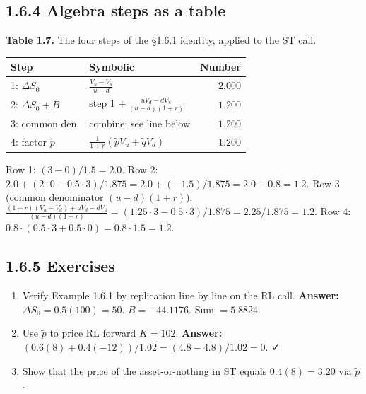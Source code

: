 \documentclass[
  10pt,
  twoside]{book}
\newcounter{none} %
\providecommand{\tightlist}{%
  \setlength{\itemsep}{0pt}\setlength{\parskip}{0pt}}
\begin{document}
\subsection{1.6.4 Algebra steps as a
table}\label{algebra-steps-as-a-table}

\textbf{Table 1.7.} The four steps of the §1.6.1 identity, applied to
the ST call.

{\def\LTcaptype{none} %
\begin{table}[H]
\centering
\begin{tabular}{|l|l|r|}
\toprule
Step & Symbolic & Number \\
\midrule



1: \(\Delta S_0\) & \(\tfrac{V_u-V_d}{u-d}\) & \(2.000\) \\
2: \(\Delta S_0+B\) & step 1 \(+\,\tfrac{uV_d-dV_u}{(u-d)(1+r)}\) &
\(1.200\) \\
3: common den. & combine: see line below & \(1.200\) \\
4: factor \(\tilde p\) & \(\tfrac{1}{1+r}(\tilde p V_u+\tilde q V_d)\) &
\(1.200\) \\
\bottomrule
\end{tabular}
\end{table}
}

Row 1: \((3-0)/1.5 = 2.0\). Row 2:
\(2.0 + (2\cdot 0 - 0.5\cdot 3)/1.875 = 2.0 + (-1.5)/1.875 = 2.0 - 0.8 = 1.2\).
Row 3 (common denominator \((u-d)(1+r)\)):
\(\tfrac{(1+r)(V_u-V_d) + uV_d - dV_u}{(u-d)(1+r)} = (1.25\cdot 3 - 0.5\cdot 3)/1.875 = 2.25/1.875 = 1.2\).
Row 4: \(0.8 \cdot (0.5 \cdot 3 + 0.5 \cdot 0) = 0.8 \cdot 1.5 = 1.2\).

\subsection{1.6.5 Exercises}\label{exercises-16}

\begin{enumerate}
\def\labelenumi{\arabic{enumi}.}
\tightlist
\item
  Verify Example 1.6.1 by replication line by line on the RL call.
  \textbf{Answer:} \(\Delta S_0=0.5(100)=50\). \(B=-44.1176\). Sum
  \(=5.8824\).
\item
  Use \(\tilde p\) to price RL forward \(K=102\). \textbf{Answer:}
  \((0.6(8)+0.4(-12))/1.02=(4.8-4.8)/1.02=0\). ✓
\item
  Show that the price of the asset-or-nothing in ST equals
  \(0.4(8) = 3.20\) via \(\tilde p\).
\end{enumerate}
\end{document}
